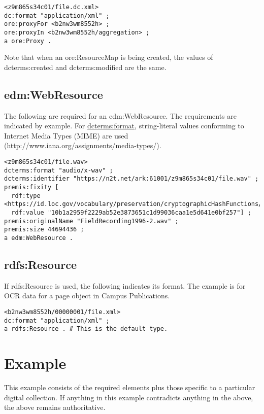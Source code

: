 \documentclass[11pt]{article}
\begin{document}
\begin{verbatim}
<z9m865s34c01/file.dc.xml>
dc:format "application/xml" ;
ore:proxyFor <b2nw3wm8552h> ;
ore:proxyIn <b2nw3wm8552h/aggregation> ;
a ore:Proxy .
\end{verbatim}

Note that when an ore:ResourceMap is being created, the values of dcterms:created and dcterms:modified are the same.

\subsection{edm:WebResource}

The following are required for an edm:WebResource. The requirements are indicated by example. For \underline{dcterms:format}, string-literal values conforming to Internet Media Types (MIME) are used (http://www.iana.org/assignments/media-types/).

\begin{verbatim}
<z9m865s34c01/file.wav> 
dcterms:format "audio/x-wav" ;
dcterms:identifier "https://n2t.net/ark:61001/z9m865s34c01/file.wav" ;
premis:fixity [
  rdf:type <https://id.loc.gov/vocabulary/preservation/cryptographicHashFunctions/sha512>;
  rdf:value "10b1a2959f2229ab52e3873651c1d99036caa1e5d641e0bf257"] ;
premis:originalName "FieldRecording1996-2.wav" ;
premis:size 44694436 ;
a edm:WebResource .
\end{verbatim}

\subsection{rdfs:Resource}

If rdfs:Resource is used, the following indicates its format. The example is for OCR data for a page object in Campus Publications.

\begin{verbatim}
<b2nw3wm8552h/00000001/file.xml>
dc:format "application/xml" ;
a rdfs:Resource . # This is the default type. 
\end{verbatim}

\pagebreak[4]
\section{Example}
This example consists of the required elements plus those specific to a particular digital collection. If anything in this example contradicts anything in the above, the above remains authoritative.


\end{document}
